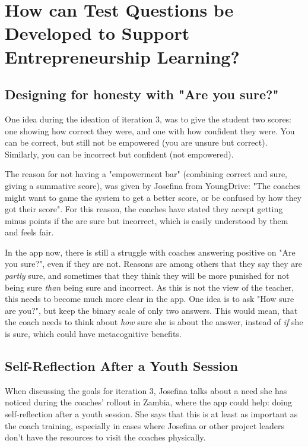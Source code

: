 \section{How can Test Questions be Developed to Support Entrepreneurship Learning?}

\subsection{Designing for honesty with "Are you sure?"}


One idea during the ideation of iteration 3, was to give the student two scores: one showing how correct they were, and one with how confident they were. You can be correct, but still not be empowered (you are unsure but correct). Similarly, you can be incorrect but confident (not empowered).

The reason for not having a "empowerment bar" (combining correct and sure, giving a summative score), was given by Josefina from YoungDrive: "The coaches might want to game the system to get a better score, or be confused by how they got their score". For this reason, the coaches have stated they accept getting minus points if the are sure but incorrect, which is easily understood by them and feels fair.

In the app now, there is still a struggle with coaches answering positive on "Are you sure?", even if they are not. Reasons are among others that they say they are \textit{partly} sure, and sometimes that they think they will be more punished for not being sure \textit{than} being sure and incorrect. As this is not the view of the teacher, this needs to become much more clear in the app. One idea is to ask "How sure are you?", but keep the binary scale of only two answers. This would mean, that the coach needs to think about \textit{how} sure she is about the answer, instead of \textit{if} she is sure, which could have metacognitive benefits.

\subsection{Self-Reflection After a Youth Session}
When discussing the goals for iteration 3, Josefina talks about a need she has noticed during the coaches' rollout in Zambia, where the app could help: doing self-reflection after a youth session. She says that this is at least as important as the coach training, especially in cases where Josefina or other project leaders don't have the resources to visit the coaches physically.

